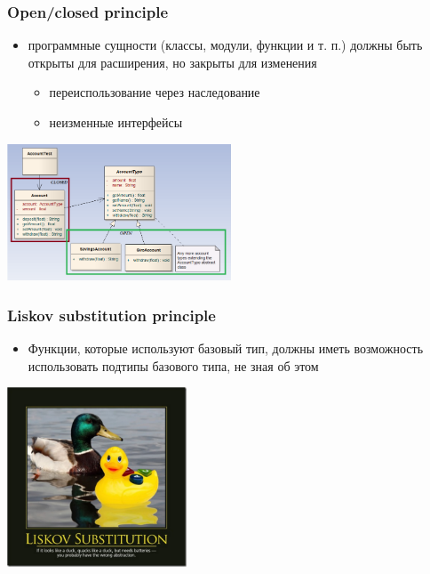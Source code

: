 \documentclass{../../slides-style}
\begin{document}
    \begin{frame}
        \frametitle{Open/closed principle}
        \begin{itemize}
            \item программные сущности (классы, модули, функции и т. п.) должны быть открыты для расширения, но закрыты для изменения
            \begin{itemize}
                \item переиспользование через наследование
                \item неизменные интерфейсы
            \end{itemize}
        \end{itemize}
        \begin{flushright}
            \includegraphics[width=0.5\textwidth]{openClosedPrinciple.png}
        \end{flushright}
    \end{frame}

    \begin{frame}
        \frametitle{Liskov substitution principle}
        \begin{itemize}
            \item Функции, которые используют базовый тип, должны иметь возможность использовать подтипы базового типа, не зная об этом
        \end{itemize}
        \begin{flushright}
            \includegraphics[width=0.4\textwidth]{liskovSubstitutionPrinciple.png}
        \end{flushright}
    \end{frame}
\end{document}
